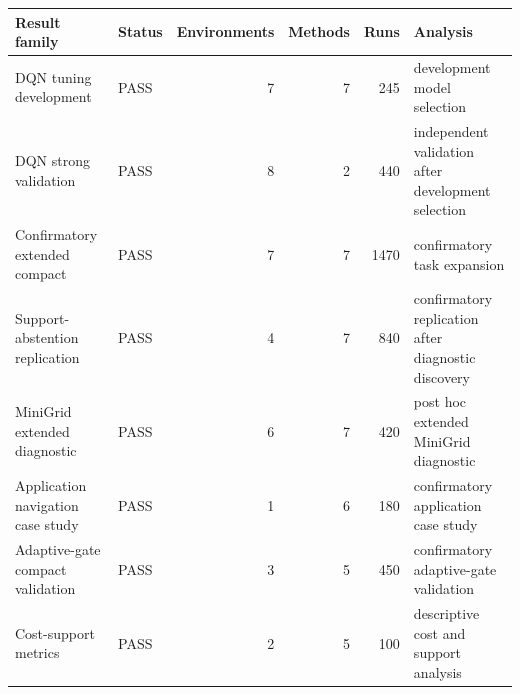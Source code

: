 \begin{tabular}{llrrrl}
\toprule
Result family & Status & Environments & Methods & Runs & Analysis \\
\midrule
DQN tuning development & PASS & 7 & 7 & 245 & development model selection \\
DQN strong validation & PASS & 8 & 2 & 440 & independent validation after development selection \\
Confirmatory extended compact & PASS & 7 & 7 & 1470 & confirmatory task expansion \\
Support-abstention replication & PASS & 4 & 7 & 840 & confirmatory replication after diagnostic discovery \\
MiniGrid extended diagnostic & PASS & 6 & 7 & 420 & post hoc extended MiniGrid diagnostic \\
Application navigation case study & PASS & 1 & 6 & 180 & confirmatory application case study \\
Adaptive-gate compact validation & PASS & 3 & 5 & 450 & confirmatory adaptive-gate validation \\
Cost-support metrics & PASS & 2 & 5 & 100 & descriptive cost and support analysis \\
\bottomrule
\end{tabular}
